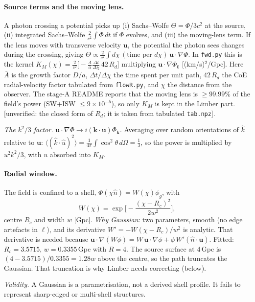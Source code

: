 \documentclass[10pt,twocolumn]{article}
\newcommand{\why}[1]{\par\noindent\textit{Validity.} #1\par}
\newcommand{\flag}[1]{\textsf{[unverified: #1]}}
\begin{document}
\paragraph{Source terms and the moving lens.} A photon crossing a potential picks up (i) Sachs--Wolfe $\Theta=\Phi/3c^2$ at the source, (ii) integrated Sachs--Wolfe $\frac{2}{c^2}\int\dot\Phi\,dt$ if $\Phi$ evolves, and (iii) the moving-lens term. If the lens moves with transverse velocity $\mathbf u$, the potential the photon sees changes during the crossing, giving $\Theta\propto\frac{2}{c^2}\int d\chi\,(\text{time per }d\chi)\,\mathbf u\cdot\nabla\Phi$. In \texttt{fwd.py} this is the kernel $K_M(\chi)=\frac{2}{c^2}\big[-\frac{\bar A}{a}\frac{\Delta t}{\Delta\chi}\,42\,R_d\big]$ multiplying $\mathbf u\cdot\nabla\Phi_0$ [(km/s)$^2$/Gpc]. Here $\bar A$ is the growth factor $D/a$, $\Delta t/\Delta\chi$ the time spent per unit path, $42\,R_d$ the CoE radial-velocity factor tabulated from \texttt{flowR.py}, and $\chi$ the distance from the observer. The stage-A README reports that the moving lens is $\ge99.99\%$ of the field's power (SW+ISW $\le9\times10^{-5}$), so only $K_M$ is kept in the Limber part. \flag{the closed form of $R_d$; it is taken from tabulated \texttt{tab.npz}}.

\emph{The $k^2/3$ factor.} $\mathbf u\cdot\nabla\Phi\to i(\mathbf k\cdot\mathbf u)\Phi_{\mathbf k}$. Averaging over random orientations of $\hat k$ relative to $\mathbf u$: $\langle(\hat k\cdot\hat u)^2\rangle=\frac{1}{4\pi}\int\cos^2\theta\,d\Omega=\tfrac13$, so the power is multiplied by $u^2k^2/3$, with $u$ absorbed into $K_M$.

\paragraph{Radial window.} The field is confined to a shell, $\Phi(\chi\hat n)=W(\chi)\phi_g$, with
\begin{equation}
W(\chi)=\exp\!\Big[-\frac{(\chi-R_c)^2}{2w^2}\Big],
\end{equation}
centre $R_c$ and width $w$ [Gpc]. \emph{Why Gaussian}: two parameters, smooth (no edge artefacts in $\ell$), and its derivative $W'=-W(\chi-R_c)/w^2$ is analytic. That derivative is needed because $\mathbf u\cdot\nabla(W\phi)=W\,\mathbf u\cdot\nabla\phi+\phi\,W'(\hat n\cdot\mathbf u)$. Fitted: $R_c=3.5715$, $w=0.3355$\,Gpc with $R=4$. The source surface at 4\,Gpc is $(4-3.5715)/0.3355=1.28w$ above the centre, so the path truncates the Gaussian. That truncation is why Limber needs correcting (below).
\why{A Gaussian is a parametrisation, not a derived shell profile. It fails to represent sharp-edged or multi-shell structures.}
\end{document}
